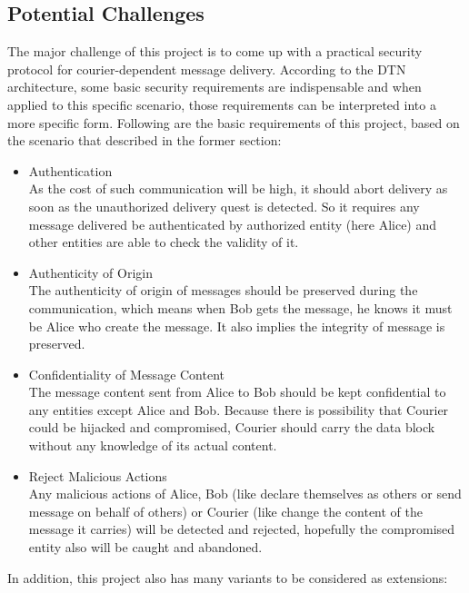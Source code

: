 \documentclass[11pt,a4paper]{article}
\begin{document}
\subsection{Potential Challenges}
The major challenge of this project is to come up with a practical security protocol for courier-dependent message delivery. According to the DTN architecture, some basic security requirements are indispensable \cite{cerf} and when applied to this specific scenario, those requirements can be interpreted into a more specific form. Following are the basic requirements of this project, based on the scenario that described in the former section:
\begin{itemize}
\item Authentication\\
As the cost of such communication will be high, it should abort delivery as soon as the unauthorized delivery quest is detected. So it requires any message delivered be authenticated by authorized entity (here Alice) and other entities are able to check the validity of it. 
\item Authenticity of Origin\\
The authenticity of origin of messages should be preserved during the communication, which means when Bob gets the message, he knows it must be Alice who create the message. It also implies the integrity of message is preserved.
\item Confidentiality of Message Content\\
The message content sent from Alice to Bob should be kept confidential to any entities except Alice and Bob. Because there is possibility that Courier could be hijacked and compromised, Courier should carry the data block without any knowledge of its actual content.
\item Reject Malicious Actions\\
Any malicious actions of Alice, Bob (like declare themselves as others or send message on behalf of others) or Courier (like change the content of the message it carries) will be detected and rejected, hopefully the compromised entity also will be caught and abandoned.
\end{itemize}
In addition, this project also has many variants to be considered as extensions:
\end{document}

